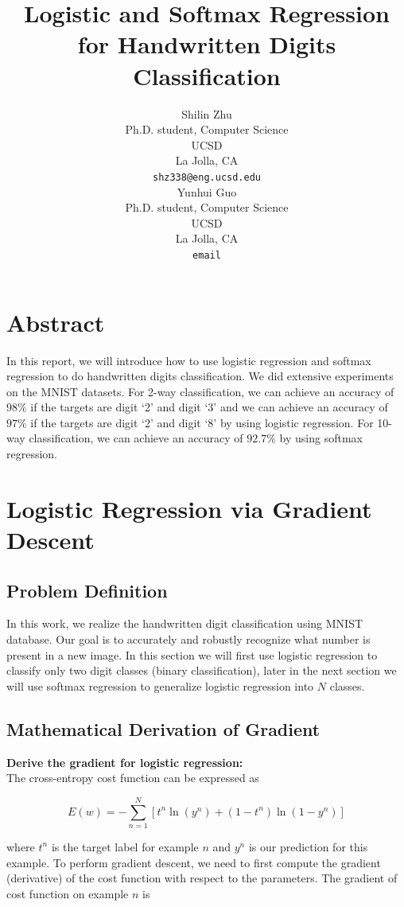 \documentclass{article} %
\title{Logistic and Softmax Regression for Handwritten Digits Classification}
\author{
Shilin Zhu \\
Ph.D. student, Computer Science\\
UCSD\\
La Jolla, CA \\
\texttt{shz338@eng.ucsd.edu} \\
\And
Yunhui Guo\\
Ph.D. student, Computer Science\\
UCSD\\
La Jolla, CA \\
\texttt{email} \\
}
\begin{document}
\maketitle

\section{Abstract}
In this report, we will introduce how to use logistic regression and softmax regression to do handwritten digits classification. We did extensive experiments on the MNIST datasets. For 2-way classification, we can achieve an accuracy of $98\%$ if the targets are digit `2' and digit `3' and we can achieve an accuracy of $97\%$ if the targets are digit `2' and digit `8' by using logistic regression. For 10-way classification, we can achieve an accuracy  of $92.7\%$ by using softmax regression.

\section{Logistic Regression via Gradient Descent}

\subsection{Problem Definition}
In this work, we realize the handwritten digit classification using MNIST database. Our goal is to accurately and robustly recognize what number is present in a new image. In this section we will first use logistic regression to classify only two digit classes (binary classification), later in the next section we will use softmax regression to generalize logistic regression into $N$ classes.

\subsection{Mathematical Derivation of Gradient}
\textbf{Derive the gradient for logistic regression:} \\
The cross-entropy cost function can be expressed as

\begin{equation}
	E(w) = - \sum_{n=1}^{N}[t^{n}\ln(y^{n})+(1-t^{n})\ln(1-y^{n})]
\end{equation}

where $t^{n}$ is the target label for example $n$ and $y^{n}$ is our prediction for this example. To perform gradient descent, we need to first compute the gradient (derivative) of the cost function with respect to the parameters. The gradient of cost function on example $n$ is
\end{document}
